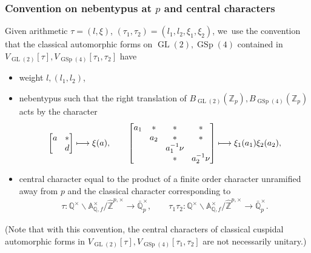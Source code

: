 \documentclass[JEP,XML,SOM,Unicode,published]{cedram}
\newcommand\mto{\mathchoice{\longmapsto}{\mapsto}{\mapsto}{\mapsto}}
\theoremstyle{plain}
\theoremstyle{remark}
\newcommand{\bA}{\mathbb{A}}
\newcommand{\bQ}{\mathbb{Q}}
\newcommand{\bZ}{\mathbb{Z}}
\DeclareMathOperator{\GL}{GL}
\DeclareMathOperator{\GSp}{GSp}
\begin{document}
\subsubsection{Convention on nebentypus at \texorpdfstring{$p$}{p} and central characters}
Given arithmetic $\tau=(l,\xi)$, $(\tau_1,\tau_2)=(l_1,l_2,\xi_1,\xi_2)$, we~use the convention that the classical automorphic forms on $\GL(2),\GSp(4)$ contained in $V_{\GL(2)}[\tau],V_{\GSp(4)}[\tau_1,\tau_2]$ have
\begin{itemize}
\item
weight $l,(l_1,l_2)$,
\item
nebentypus such that the right translation of $B_{\GL(2)}(\bZ_p),B_{\GSp(4)}(\bZ_p)$ acts by the character
\begin{align}
\label{eq:pneben}
\arraycolsep4.5pt
\begin{bmatrix}a&\ast\\ &d\end{bmatrix}
\mto
\xi(a),
\qquad
\begin{bmatrix} a_1&\ast&\ast&\ast\\&a_2&\ast&\ast\\ && a^{-1}_1\nu\\ &&\ast& a^{-1}_2\nu\end{bmatrix}
\mto
\xi_1(a_1)\xi_2(a_2),
\end{align}
\item
central character equal to the product of a finite order character unramified away from $p$ and the classical character corresponding to
\begin{align*}
\tau:\bQ^\times\backslash \bA^\times_{\bQ,f}/\hat{\bZ}^{p,\times}\to \bar{\bQ}^\times_p,
\qquad\tau_1\tau_2:\bQ^\times\backslash \bA^\times_{\bQ,f}/\hat{\bZ}^{p,\times}\to \bar{\bQ}^\times_p.
\end{align*}
\end{itemize}
(Note that with this convention, the central characters of classical cuspidal automorphic forms in $V_{\GL(2)}[\tau],V_{\GSp(4)}[\tau_1,\tau_2]$ are not necessarily unitary.)

\label{sec:EisMeas}
\end{document}
